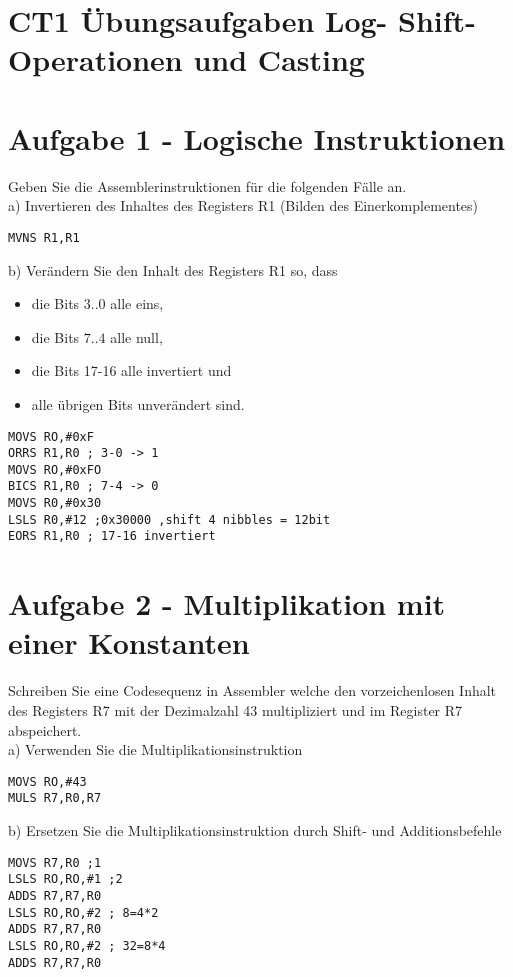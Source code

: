 \documentclass[10pt]{article}
\begin{document}
\section*{CT1 Übungsaufgaben Log- Shift-Operationen und Casting}
\section*{Aufgabe 1 - Logische Instruktionen}
Geben Sie die Assemblerinstruktionen für die folgenden Fälle an.\\
a) Invertieren des Inhaltes des Registers R1 (Bilden des Einerkomplementes)

\begin{verbatim}
MVNS R1,R1
\end{verbatim}

b) Verändern Sie den Inhalt des Registers R1 so, dass

\begin{itemize}
  \item die Bits $3 . .0$ alle eins,
  \item die Bits $7 . .4$ alle null,
  \item die Bits 17-16 alle invertiert und
  \item alle übrigen Bits unverändert sind.
\end{itemize}

\begin{verbatim}
MOVS RO,#0xF
ORRS R1,R0 ; 3-0 -> 1
MOVS RO,#0xFO
BICS R1,R0 ; 7-4 -> 0
MOVS R0,#0x30
LSLS R0,#12 ;0x30000 ,shift 4 nibbles = 12bit
EORS R1,R0 ; 17-16 invertiert
\end{verbatim}

\section*{Aufgabe 2 - Multiplikation mit einer Konstanten}
Schreiben Sie eine Codesequenz in Assembler welche den vorzeichenlosen Inhalt des Registers R7 mit der Dezimalzahl 43 multipliziert und im Register R7 abspeichert.\\
a) Verwenden Sie die Multiplikationsinstruktion

\begin{verbatim}
MOVS RO,#43
MULS R7,R0,R7
\end{verbatim}

b) Ersetzen Sie die Multiplikationsinstruktion durch Shift- und Additionsbefehle

\begin{verbatim}
MOVS R7,R0 ;1
LSLS RO,RO,#1 ;2
ADDS R7,R7,R0
LSLS RO,RO,#2 ; 8=4*2
ADDS R7,R7,R0
LSLS RO,RO,#2 ; 32=8*4
ADDS R7,R7,R0
\end{verbatim}
\end{document}
